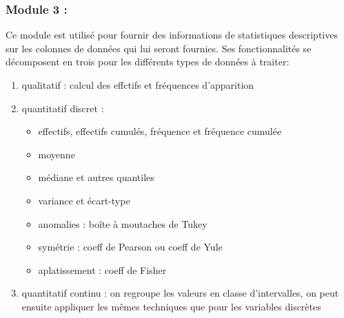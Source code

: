 				\subsubsection{Module 3 :}
				Ce module est utilisé pour fournir des informations de statistiques descriptives sur les colonnes de données qui lui seront fournies. Ses fonctionnalités se décomposent en trois pour les différents types de données à traiter:\\
				\begin{enumerate}
				\item qualitatif : calcul des effctifs et fréquences d'apparition
				\item quantitatif discret :\\
					\begin{itemize}
					\item effectifs, effectifs cumulés, fréquence et fréquence cumulée
					\item moyenne
					\item médiane et autres quantiles
					\item variance et écart-type
					\item anomalies : boîte à moutaches de Tukey
					\item symétrie : coeff de Pearson ou coeff de Yule
					\item aplatissement : coeff de Fisher
					\end{itemize}
				\item quantitatif continu : on regroupe les valeurs en classe d'intervalles, on peut ensuite appliquer les mêmes techniques que pour les variables discrètes
				\end{enumerate}
			
